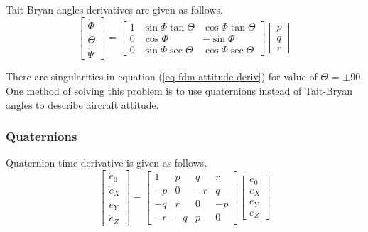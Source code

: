 Tait-Bryan angles derivatives are given as follows. \cite{Sibilski2004, Allerton2009}
\begin{equation}
  \label{eq-fdm-attitude-deriv}
  \left[
    \begin{matrix}
      \dot \Phi \\
      \dot \Theta \\
      \dot \Psi
    \end{matrix}
  \right]
  =
  \left[
    \begin{matrix}
      1 & \sin \Phi \tan \Theta & \cos \Phi \tan \Theta \\
      0 & \cos \Phi & -\sin \Phi \\
      0 & \sin \Phi \sec \Theta & \cos \Phi \sec \Theta
    \end{matrix}
  \right]
  \left[
    \begin{matrix}
      p \\
      q \\
      r
    \end{matrix}
  \right]
\end{equation}

There are singularities in equation (\ref{eq-fdm-attitude-deriv}) for value of $\Theta$ = $\pm$90\degree . One method of solving this problem is to use quaternions instead of Tait-Bryan angles to describe aircraft attitude.

\subsubsection{Quaternions}

Quaternion time derivative is given as follows. \cite{Sibilski2004, StevensLewis1992}
\begin{equation}
  \label{eq-fdm-quaternion-deriv}
  \left[
    \begin{matrix}
      \dot e_0 \\
      \dot e_X \\
      \dot e_Y \\
      \dot e_Z
    \end{matrix}
  \right]
  =
  \left[
    \begin{matrix}
       1 &  p &  q &  r \\
      -p &  0 & -r &  q \\
      -q &  r &  0 & -p \\
      -r & -q &  p &  0
    \end{matrix}
  \right]
  \left[
    \begin{matrix}
      e_0 \\
      e_X \\
      e_Y \\
      e_Z
    \end{matrix}
  \right]
\end{equation}

